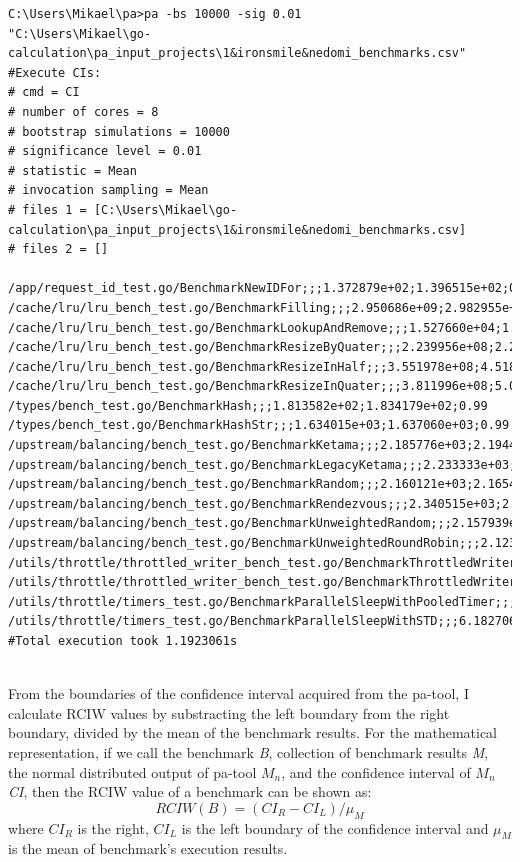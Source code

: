 \documentclass{seal_thesis}
\begin{document}
\begin{minipage}{\linewidth}

\begin{lstlisting}[caption=Example pa-tool results of ironsmile/nedomi \cite{ironsmile/nedomi}., label={lst:patool}, frame=single, breaklines=true, basicstyle=\small]
C:\Users\Mikael\pa>pa -bs 10000 -sig 0.01
"C:\Users\Mikael\go-calculation\pa_input_projects\1&ironsmile&nedomi_benchmarks.csv"
#Execute CIs:
# cmd = CI
# number of cores = 8
# bootstrap simulations = 10000
# significance level = 0.01
# statistic = Mean
# invocation sampling = Mean
# files 1 = [C:\Users\Mikael\go-calculation\pa_input_projects\1&ironsmile&nedomi_benchmarks.csv]
# files 2 = []

/app/request_id_test.go/BenchmarkNewIDFor;;;1.372879e+02;1.396515e+02;0.99
/cache/lru/lru_bench_test.go/BenchmarkFilling;;;2.950686e+09;2.982955e+09;0.99
/cache/lru/lru_bench_test.go/BenchmarkLookupAndRemove;;;1.527660e+04;1.532752e+04;0.99
/cache/lru/lru_bench_test.go/BenchmarkResizeByQuater;;;2.239956e+08;2.292164e+08;0.99
/cache/lru/lru_bench_test.go/BenchmarkResizeInHalf;;;3.551978e+08;4.518111e+08;0.99
/cache/lru/lru_bench_test.go/BenchmarkResizeInQuater;;;3.811996e+08;5.008146e+08;0.99
/types/bench_test.go/BenchmarkHash;;;1.813582e+02;1.834179e+02;0.99
/types/bench_test.go/BenchmarkHashStr;;;1.634015e+03;1.637060e+03;0.99
/upstream/balancing/bench_test.go/BenchmarkKetama;;;2.185776e+03;2.194403e+03;0.99
/upstream/balancing/bench_test.go/BenchmarkLegacyKetama;;;2.233333e+03;2.242545e+03;0.99
/upstream/balancing/bench_test.go/BenchmarkRandom;;;2.160121e+03;2.165439e+03;0.99
/upstream/balancing/bench_test.go/BenchmarkRendezvous;;;2.340515e+03;2.347833e+03;0.99
/upstream/balancing/bench_test.go/BenchmarkUnweightedRandom;;;2.157939e+03;2.164152e+03;0.99
/upstream/balancing/bench_test.go/BenchmarkUnweightedRoundRobin;;;2.123652e+03;2.130727e+03;0.99
/utils/throttle/throttled_writer_bench_test.go/BenchmarkThrottledWriter;;;4.030817e+09;4.036552e+09;0.99
/utils/throttle/throttled_writer_bench_test.go/BenchmarkThrottledWriterWithReadFrom;;;4.038926e+09;4.040731e+09;0.99
/utils/throttle/timers_test.go/BenchmarkParallelSleepWithPooledTimer;;;6.253588e+07;6.261951e+07;0.99
/utils/throttle/timers_test.go/BenchmarkParallelSleepWithSTD;;;6.182706e+07;6.191619e+07;0.99
#Total execution took 1.1923061s
	
\end{lstlisting}
\end{minipage}

\noindent From the boundaries of the confidence interval acquired from the pa-tool, I calculate RCIW values by substracting the left boundary from the right boundary, divided by the mean of the benchmark results. For the mathematical representation, if we call the benchmark \textit{B}, collection of benchmark results \textit{M}, the normal distributed output of pa-tool $M_{n}$, and the confidence interval of $M_{n}$ \textit{CI}, then the RCIW value of a benchmark can be shown as:
\[ RCIW(B) = ({CI_{R}} - {CI_{L}}) / \mu _{M} \]
where $CI_{R}$ is the right, $CI_{L}$ is the left boundary of the confidence interval and $\mu _{M}$ is the mean of benchmark's execution results.\\
\end{document}

